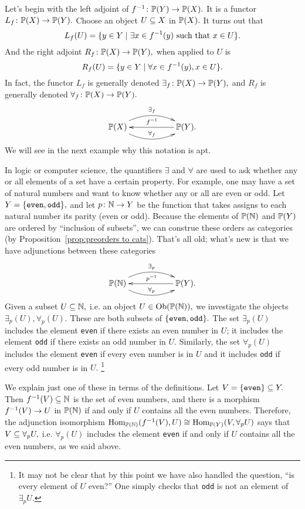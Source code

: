 \documentclass[CT4S-EN-RU]{subfiles}
\begin{document}
\begin{blockRUS}
\end{blockRUS}

\begin{blockENG}
Let's begin with the left adjoint of $f^\m1\taking\PP(Y)\to\PP(X).$ It is a functor $L_f\taking\PP(X)\to\PP(Y).$ Choose an object $U\ss X$ in $\PP(X).$ It turns out that
$$L_f(U)=\{y\in Y\|\exists x\in f^\m1(y)\tn{ such that }x\in U\}.$$
And the right adjoint $R_f\taking\PP(X)\to\PP(Y),$ when applied to $U$ is 
$$R_f(U)=\{y\in Y\|\forall x\in f^\m1(y), x\in U\}.$$
In fact, the functor $L_f$ is generally denoted $\exists_f\taking\PP(X)\to\PP(Y),$ and $R_f$ is generally denoted $\forall_f\taking\PP(X)\to\PP(Y).$ 
$$
\xymatrix{\PP(X)\ar@/^1.2pc/[rr]^{\exists_f}\ar@/_1.2pc/[rr]^{\forall_f}&&\PP(Y)\ar[ll]_{f^\m1}.}
$$
We will see in the next example why this notation is apt.
\end{blockENG}

\begin{blockRUS}
\end{blockRUS}

\begin{exampleENG}
In logic or computer science, the quantifiers $\exists$ and $\forall$ are used to ask whether any or all elements of a set have a certain property. For example, one may have a set of natural numbers and want to know whether any or all are even or odd.
Let $Y=\{{\tt even,odd}\},$ and let $p\taking\NN\to Y$ be the function that takes assigns to each natural number its parity (even or odd). Because the elements of $\PP(\NN)$ and $\PP(Y)$ are ordered by “inclusion of subsets”, we can construe these orders as categories (by Proposition~\ref{prop:preorders to cats}). That's all old; what's new is that we have adjunctions between these categories
$$
\xymatrix{\PP(\NN)\ar@/^1.2pc/[rr]^{\exists_p}\ar@/_1.2pc/[rr]^{\forall_p}&&\PP(Y)\ar[ll]_{p^\m1}.}
$$
Given a subset $U\ss\NN,$ i.e. an object $U\in\Ob(\PP(\NN)),$ we investigate the objects $\exists_p(U),\forall_p(U).$ These are both subsets of $\{{\tt even,odd}\}.$ The set $\exists_p(U)$ includes the element {\tt even} if there exists an even number in $U$; it includes the element {\tt odd} if there exists an odd number in $U.$ Similarly, the set $\forall_p(U)$ includes the element {\tt even} if every even number is in $U$ and it includes {\tt odd} if every odd number is in $U.$
\footnote{It may not be clear that by this point we have also handled the question, “is every element of $U$ even?” One simply checks that {\tt odd} is not an element of $\exists_pU.$}

We explain just one of these in terms of the definitions. Let $V=\{{\tt even}\}\ss Y.$ Then $f^\m1(V)\ss\NN$ is the set of even numbers, and there is a morphism $f^\m1(V)\to U$ in $\PP(\NN)$ if and only if $U$ contains all the even numbers. Therefore, the adjunction isomorphism $\Hom_{\PP(\NN)}(f^\m1(V),U)\iso\Hom_{\PP(Y)}(V,\forall_pU)$ says that $V\ss\forall_pU,$ i.e. $\forall_p(U)$ includes the element {\tt even} if and only if $U$ contains all the even numbers, as we said above.
\end{exampleENG}
\end{document}
